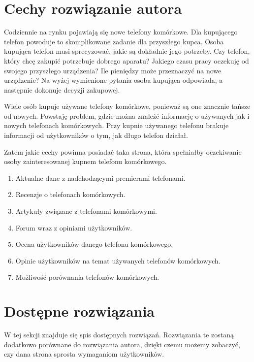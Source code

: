 \section{Cechy rozwiązanie autora}
\label{ideal_solution}
Codziennie na rynku pojawiają się nowe telefony komórkowe. Dla kupującego telefon powoduje to skomplikowane zadanie dla przyszłego kupca. Osoba kupująca telefon musi sprecyzować, jakie są dokładnie jego potrzeby. Czy telefon, który chcę zakupić potrzebuje dobrego aparatu? Jakiego czasu pracy oczekuję od swojego przyszłego urządzenia? Ile pieniędzy może przeznaczyć na nowe urządzenie? Na wyżej wymienione pytania osoba kupująca odpowiada, a następnie dokonuje decyzji zakupowej.

Wiele osób kupuje używane telefony komórkowe, ponieważ są one znacznie tańsze od nowych. Powstaję problem, gdzie można znaleźć informację o używanych jak i nowych telefonach komórkowych. Przy kupnie używanego telefonu brakuje informacji od użytkowników o tym, jak długo telefon działał.  

Zatem jakie cechy powinna posiadać taka strona, która spełniałby oczekiwanie osoby zainteresowanej kupnem telefonu komórkowego.
\begin{enumerate}
    \item Aktualne dane z nadchodzącymi premierami telefonami.
    \item Recenzje o telefonach komórkowych.
    \item Artykuły związane z telefonami komórkowymi.
    \item Forum wraz z opiniami użytkowników.
    \item Ocena użytkowników danego telefonu komórkowego.
    \item Opinie użytkowników na temat używanych telefonów komórkowych.
    \item Możliwość porównania telefonów komórkowych.
\end{enumerate}

\section{Dostępne rozwiązania}
W tej sekcji znajduje się spis dostępnych rozwiązań. Rozwiązania te zostaną dodatkowo porównane do rozwiązania autora, dzięki czemu możemy zobaczyć, czy dana strona sprosta wymaganiom użytkowników.

